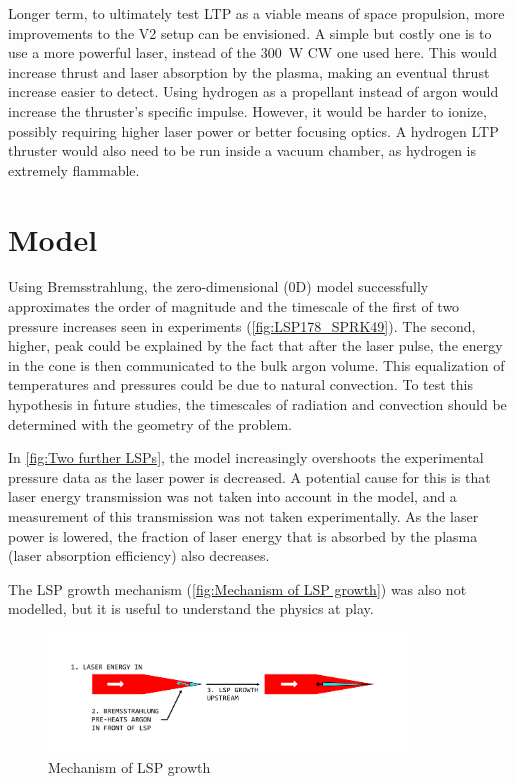 Longer term, to ultimately test LTP as a viable means of space propulsion, more improvements to the V2 setup can be envisioned. A simple but costly one is to use a more powerful laser, instead of the \qty{300}{W} CW one used here. This would increase thrust and laser absorption by the plasma, making an eventual thrust increase easier to detect. Using hydrogen as a propellant instead of argon would increase the thruster's specific impulse. However, it would be harder to ionize, possibly requiring higher laser power or better focusing optics. A hydrogen LTP thruster would also need to be run inside a vacuum chamber, as hydrogen is extremely flammable.

\section{Model}

    Using Bremsstrahlung, the zero-dimensional (0D) model successfully approximates the order of magnitude and the timescale of the first of two pressure increases seen in experiments (\autoref{fig:LSP178_SPRK49}). The second, higher, peak could be explained by the fact that after the laser pulse, the energy in the cone is then communicated to the bulk argon volume. This equalization of temperatures and pressures could be due to natural convection. To test this hypothesis in future studies, the timescales of radiation and convection should be determined with the geometry of the problem.

    In \autoref{fig:Two further LSPs}, the model increasingly overshoots the experimental pressure data as the laser power is decreased. A potential cause for this is that laser energy transmission was not taken into account in the model, and a measurement of this transmission was not taken experimentally. As the laser power is lowered, the fraction of laser energy that is absorbed by the plasma (laser absorption efficiency) also decreases.
    
    The LSP growth mechanism (\autoref{fig:Mechanism of LSP growth}) was also not modelled, but it is useful to understand the physics at play.

    \begin{figure}[!ht]
        \centering
        \includegraphics[width=0.85\textwidth]{assets/2 models/Mechanism of LSP growth.pdf}
        \caption{Mechanism of LSP growth}
        \label{fig:Mechanism of LSP growth}
    \end{figure}


